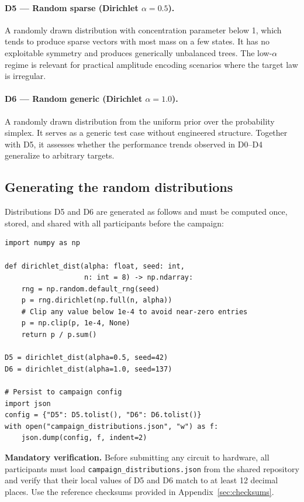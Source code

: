 \documentclass[11pt,a4paper]{article}
\begin{document}
\paragraph{D5 — Random sparse (Dirichlet $\alpha=0.5$).}
A randomly drawn distribution with concentration parameter below 1,
which tends to produce sparse vectors with most mass on a few states.
It has no exploitable symmetry and produces generically unbalanced
trees. The low-$\alpha$ regime is relevant for practical amplitude
encoding scenarios where the target law is irregular.

\paragraph{D6 — Random generic (Dirichlet $\alpha=1.0$).}
A randomly drawn distribution from the uniform prior over the
probability simplex. It serves as a generic test case without
engineered structure. Together with D5, it assesses whether the
performance trends observed in D0--D4 generalize to arbitrary targets.

\subsection{Generating the random distributions}
\label{subsec:random}

Distributions D5 and D6 are generated as follows and must be
computed once, stored, and shared with all participants before the
campaign:

\begin{lstlisting}[caption={Deterministic generation of random distributions D5 and D6.}]
import numpy as np

def dirichlet_dist(alpha: float, seed: int,
                   n: int = 8) -> np.ndarray:
    rng = np.random.default_rng(seed)
    p = rng.dirichlet(np.full(n, alpha))
    # Clip any value below 1e-4 to avoid near-zero entries
    p = np.clip(p, 1e-4, None)
    return p / p.sum()

D5 = dirichlet_dist(alpha=0.5, seed=42)
D6 = dirichlet_dist(alpha=1.0, seed=137)

# Persist to campaign config
import json
config = {"D5": D5.tolist(), "D6": D6.tolist()}
with open("campaign_distributions.json", "w") as f:
    json.dump(config, f, indent=2)
\end{lstlisting}

\begin{protocolbox}
\textbf{Mandatory verification.}
Before submitting any circuit to hardware, all participants must
load \texttt{campaign\_distributions.json} from the shared
repository and verify that their local values of D5 and D6
match to at least 12 decimal places. Use the reference checksums
provided in Appendix~\ref{sec:checksums}.
\end{protocolbox}
\end{document}
